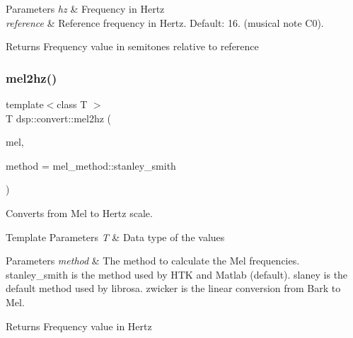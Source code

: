 \begin{DoxyParams}{Parameters}
{\em hz} & Frequency in Hertz \\
\hline
{\em reference} & Reference frequency in Hertz. Default\+: 16. (musical note C0). \\
\hline
\end{DoxyParams}
\begin{DoxyReturn}{Returns}
Frequency value in semitones relative to reference 
\end{DoxyReturn}
\mbox{\label{namespacedsp_1_1convert_ac9b36e4ccd67735222b8fc4366612873}} 
\subsubsection{\texorpdfstring{mel2hz()}{mel2hz()}}
{\footnotesize\ttfamily template$<$class T $>$ \\
T dsp\+::convert\+::mel2hz (\begin{DoxyParamCaption}\item[{T}]{mel,  }\item[{\mbox{\hyperlink{namespacedsp_1_1convert_a597c04e9527c14c1280a917016852b59}{mel\+\_\+method}}}]{method = {\ttfamily mel\+\_\+method\+:\+:stanley\+\_\+smith} }\end{DoxyParamCaption})}



Converts from Mel to Hertz scale. 


\begin{DoxyTemplParams}{Template Parameters}
{\em T} & Data type of the values \\
\hline
\end{DoxyTemplParams}

\begin{DoxyParams}{Parameters}
{\em method} & The method to calculate the Mel frequencies. \textquotesingle{}stanley\+\_\+smith\textquotesingle{} is the method used by H\+TK and Matlab (default). \textquotesingle{}slaney\textquotesingle{} is the default method used by librosa. \textquotesingle{}zwicker\textquotesingle{} is the linear conversion from Bark to Mel. \\
\hline
\end{DoxyParams}
\begin{DoxyReturn}{Returns}
Frequency value in Hertz 
\end{DoxyReturn}
\mbox{\label{namespacedsp_1_1convert_a0750088a2969488bd248817da35129eb}} 

